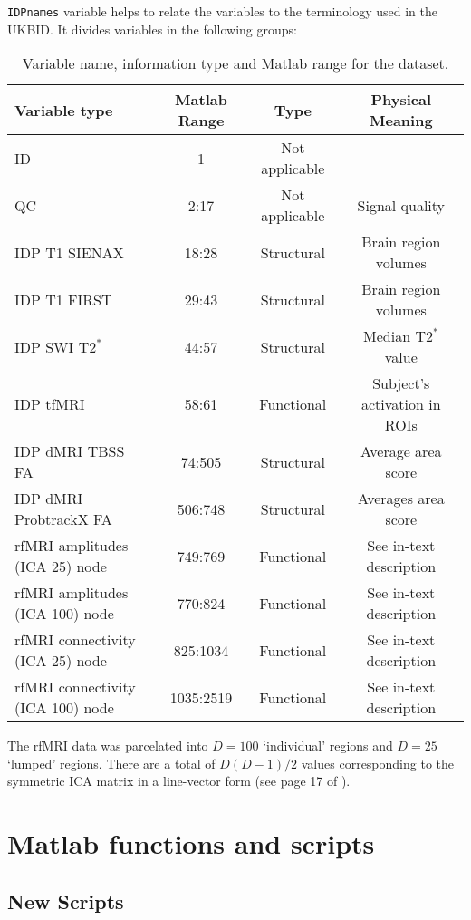 \documentclass{article}
\begin{document}
{\tt IDPnames} variable helps to relate the variables to the terminology used in the UKBID. It divides variables in the following groups:
\begin{table}
  \centering
  \caption{Variable name, information type and  Matlab range for the dataset.}
  \begin{tabular}{lccc}
    \toprule
    {\bf Variable type} & {\bf Matlab Range} & {\bf Type} &{\bf Physical Meaning}\\
    \midrule
    ID  & 1 & Not applicable & --- \\
    QC  & 2:17 & Not applicable & Signal quality\\
    IDP T1 SIENAX & 18:28 & Structural & Brain region volumes\\
    IDP T1 FIRST & 29:43 & Structural & Brain region volumes\\
    IDP SWI $\text{T2}^{*}$ & 44:57 & Structural & Median $\text{T2}^{*}$ value\\
    IDP tfMRI & 58:61 & Functional & Subject's activation in ROIs\\
    IDP dMRI TBSS FA & 74:505 & Structural &  Average area score\\
    IDP dMRI ProbtrackX FA & 506:748 & Structural & Averages area score\\
    rfMRI amplitudes (ICA 25) node    & 749:769 & Functional & See in-text description\\
    rfMRI amplitudes (ICA 100) node   & 770:824 & Functional & See in-text description\\
    rfMRI connectivity (ICA 25) node  & 825:1034 & Functional & See in-text description\\
    rfMRI connectivity (ICA 100) node & 1035:2519 & Functional &  See in-text description\\
    \bottomrule
  \end{tabular}
  \label{tab:data-ranges}
\end{table}

The rfMRI data was parcelated into $D=100$ `individual' regions and $D=25$ `lumped' regions. There are a total of $D (D-1) / 2$ values corresponding to the symmetric ICA matrix in a line-vector form (see page 17 of \cite{Smith2016}).

\section{Matlab functions and scripts\label{sec:matlab}}

\subsection{New Scripts}
\end{document}
